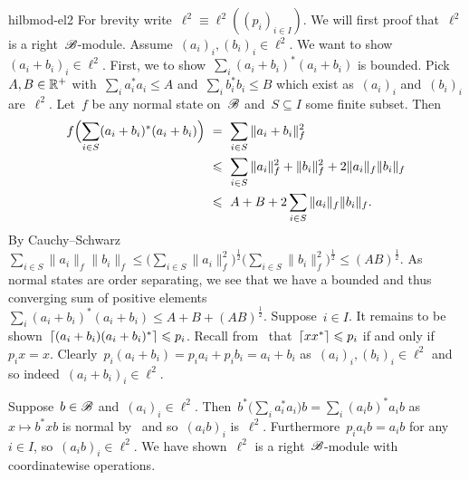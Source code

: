 \begin{solution}{hilbmod-el2}%
For brevity write~$\ell^2 \equiv \ell^2((p_i)_{i \in I})$.
We will first proof that~$\ell^2$ is a right~$\scrB$-module.
Assume~$(a_i)_i, (b_i)_i \in \ell^2$.
    We want to show~$(a_i+b_i)_i \in \ell^2$.
    First, we to show~$\sum_i (a_i + b_i)^*(a_i+b_i)$ is bounded.
Pick~$A,B\in \R^+$ with~$\sum_i a_i^*a_i \leq A$
    and~$\sum_i b_i^* b_i \leq B$ which exist
    as~$(a_i)_i$ and~$(b_i)_i$ are~$\ell^2$.
Let~$f$ be any normal state on~$\scrB$
    and~$S \subseteq I$ some finite subset.
Then
\begin{align*}
    f \Bigl(\sum_{i \in S} (a_i + b_i)^*(a_i + b_i) \Bigr)
        & \ =\ \sum_{i \in S} \| a_i + b_i\|_f^2  \\
        & \ \leq\ \sum_{i \in S} \| a_i\|_f^2  +\| b_i\|_f^2 
                                + 2\|a_i\|_f \|b_i\|_f \\
        & \ \leq\ A+B+ 2\sum_{i \in S}  \|a_i\|_f \|b_i\|_f.
\end{align*}
    By Cauchy--Schwarz~$\sum_{i \in S} \|a_i\|_f \|b_i\|_f
        \leq \bigl(\sum_{i \in S} \|a_i\|^2_f\bigr)^{\frac{1}{2}}
            \bigl(\sum_{i \in S} \|b_i\|^2_f \bigr)^{\frac{1}{2}}
            \leq (AB)^{\frac{1}{2}}$.
    As normal states are order separating,
        we see that we have a bounded and thus
        converging sum of positive elements~$\sum_i (a_i+b_i)^*(a_i+b_i) \leq 
                    A+B+(AB)^\frac{1}{2}$.
Suppose~$i \in I$.
    It remains to be shown~$\ceil{(a_i+b_i)(a_i+b_i)^*} \leq p_i$.
Recall from~
    that~$\ceil{xx^*} \leq p_i $ if and only if~$p_i x = x$.
Clearly~$p_i (a_i +b_i) =  p_i a_i + p_i b_i = a_i+b_i$
    as~$(a_i)_i, (b_i)_i \in \ell^2$ and so indeed~$(a_i+b_i)_i \in \ell^2$.

Suppose~$b \in \scrB$
    and~$(a_i)_i \in \ell^2$.
    Then~$b^* \bigl( \sum_i a_i^* a_i \bigr) b
            = \sum_i (a_i b)^* a_i b$ as~$x \mapsto b^*xb$ is normal
            by~
            and so~$(a_ib)_i$ is~$\ell^2$.
    Furthermore~$p_i a_i b = a_i b$ for any~$i \in I$,
     so~$(a_i b)_i \in \ell^2$.
     We have shown~$\ell^2$ is a right~$\scrB$-module
     with coordinatewise operations.


\end{solution}
